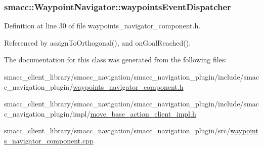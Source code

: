 \subsubsection[{\texorpdfstring{waypoints\+Event\+Dispatcher}{waypointsEventDispatcher}}]{ smacc\+::\+Waypoint\+Navigator\+::waypoints\+Event\+Dispatcher}\hypertarget{classsmacc_1_1WaypointNavigator_aab7ff616b0eba7a5ad5f03113f2de8fd}{}\label{classsmacc_1_1WaypointNavigator_aab7ff616b0eba7a5ad5f03113f2de8fd}


Definition at line 30 of file waypoints\+\_\+navigator\+\_\+component.\+h.



Referenced by assign\+To\+Orthogonal(), and on\+Goal\+Reached().



The documentation for this class was generated from the following files\+:\begin{DoxyCompactItemize}
\item 
smacc\+\_\+client\+\_\+library/smacc\+\_\+navigation/smacc\+\_\+navigation\+\_\+plugin/include/smacc\+\_\+navigation\+\_\+plugin/\hyperlink{waypoints__navigator__component_8h}{waypoints\+\_\+navigator\+\_\+component.\+h}\item 
smacc\+\_\+client\+\_\+library/smacc\+\_\+navigation/smacc\+\_\+navigation\+\_\+plugin/include/smacc\+\_\+navigation\+\_\+plugin/impl/\hyperlink{move__base__action__client__impl_8h}{move\+\_\+base\+\_\+action\+\_\+client\+\_\+impl.\+h}\item 
smacc\+\_\+client\+\_\+library/smacc\+\_\+navigation/smacc\+\_\+navigation\+\_\+plugin/src/\hyperlink{waypoints__navigator__component_8cpp}{waypoints\+\_\+navigator\+\_\+component.\+cpp}\end{DoxyCompactItemize}
